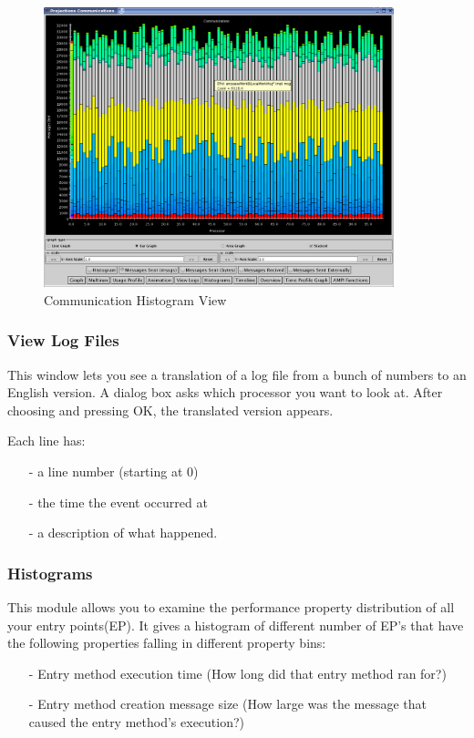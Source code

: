 \documentclass[10pt]{article}
\begin{document}
\begin{figure}[htb]
\center
\includegraphics[width=4.0in]{fig/commhistogram}
\caption{Communication Histogram View}
\label{communication histogram}
\end{figure}

\subsubsection{View Log Files}

This window lets you see a translation of a log file from a bunch of
numbers to an English version.  A dialog box asks which processor you
want to look at.  After choosing and pressing OK, the translated
version appears.

Each line has:
\begin{itemize}
\item[-] a line number (starting at 0)
\item[-] the time the event occurred at
\item[-] a description of what happened.
\end{itemize}

\subsubsection{Histograms}

This module allows you to examine the performance property
distribution of all your entry points(EP). It gives a histogram of
different number of EP's that have the following properties falling in
different property bins:

\begin{itemize}
\item[-] Entry method execution time (How long did that entry method ran for?) 
\item[-] Entry method creation message size (How large was the message
that caused the entry method's execution?)
\end{itemize}
\end{document}
